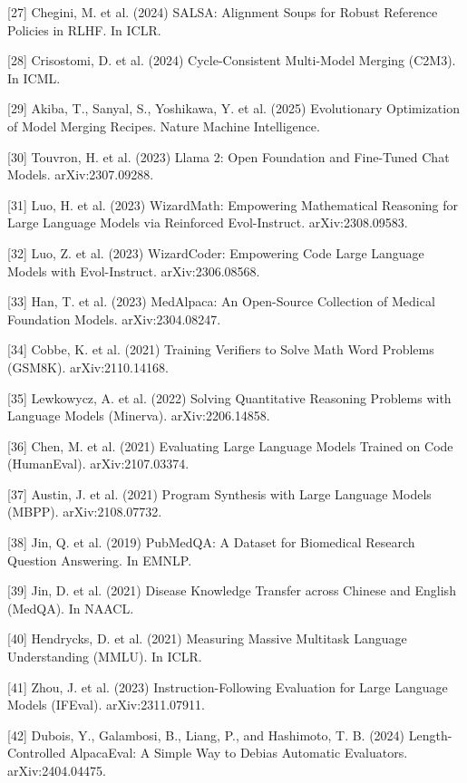 \documentclass{article}
\begin{document}
{[27] Chegini, M. et al. (2024) SALSA: Alignment Soups for Robust Reference Policies in RLHF. In ICLR.

[28] Crisostomi, D. et al. (2024) Cycle-Consistent Multi-Model Merging (C2M3). In ICML.

[29] Akiba, T., Sanyal, S., Yoshikawa, Y. et al. (2025) Evolutionary Optimization of Model Merging Recipes. Nature Machine Intelligence.

[30] Touvron, H. et al. (2023) Llama 2: Open Foundation and Fine-Tuned Chat Models. arXiv:2307.09288.

[31] Luo, H. et al. (2023) WizardMath: Empowering Mathematical Reasoning for Large Language Models via Reinforced Evol-Instruct. arXiv:2308.09583.

[32] Luo, Z. et al. (2023) WizardCoder: Empowering Code Large Language Models with Evol-Instruct. arXiv:2306.08568.

[33] Han, T. et al. (2023) MedAlpaca: An Open-Source Collection of Medical Foundation Models. arXiv:2304.08247.

[34] Cobbe, K. et al. (2021) Training Verifiers to Solve Math Word Problems (GSM8K). arXiv:2110.14168.

[35] Lewkowycz, A. et al. (2022) Solving Quantitative Reasoning Problems with Language Models (Minerva). arXiv:2206.14858.

[36] Chen, M. et al. (2021) Evaluating Large Language Models Trained on Code (HumanEval). arXiv:2107.03374.

[37] Austin, J. et al. (2021) Program Synthesis with Large Language Models (MBPP). arXiv:2108.07732.

[38] Jin, Q. et al. (2019) PubMedQA: A Dataset for Biomedical Research Question Answering. In EMNLP.

[39] Jin, D. et al. (2021) Disease Knowledge Transfer across Chinese and English (MedQA). In NAACL.

[40] Hendrycks, D. et al. (2021) Measuring Massive Multitask Language Understanding (MMLU). In ICLR.

[41] Zhou, J. et al. (2023) Instruction-Following Evaluation for Large Language Models (IFEval). arXiv:2311.07911.

[42] Dubois, Y., Galambosi, B., Liang, P., and Hashimoto, T. B. (2024) Length-Controlled AlpacaEval: A Simple Way to Debias Automatic Evaluators. arXiv:2404.04475.
}



\appendix
\end{document}
